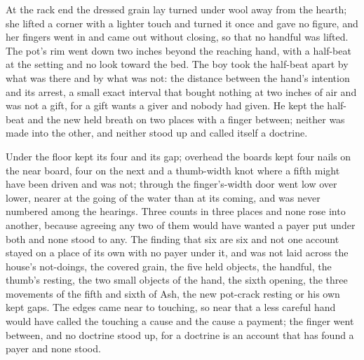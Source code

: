 At the rack end the dressed grain lay turned under wool away from the hearth; she lifted a corner with a lighter touch and turned it once and gave no figure, and her fingers went in and came out without closing, so that no handful was lifted. The pot's rim went down two inches beyond the reaching hand, with a half-beat at the setting and no look toward the bed. The boy took the half-beat apart by what was there and by what was not: the distance between the hand's intention and its arrest, a small exact interval that bought nothing at two inches of air and was not a gift, for a gift wants a giver and nobody had given. He kept the half-beat and the new held breath on two places with a finger between; neither was made into the other, and neither stood up and called itself a doctrine.

Under the floor  kept its four and its gap; overhead the boards kept four nails on the near board, four on the next and a thumb-width knot where a fifth might have been driven and was not; through the finger's-width door  went low over lower, nearer at the going of the water than at its coming, and was never numbered among the hearings. Three counts in three places and none rose into another, because agreeing any two of them would have wanted a payer put under both and none stood to any. The finding that six are six and not one account stayed on a place of its own with no payer under it, and was not laid across the house's not-doings, the covered grain, the five held objects, the handful, the thumb's resting, the two small objects of the hand, the sixth opening, the three movements of the fifth and sixth of Ash, the new pot-crack resting or his own kept gaps. The edges came near to touching, so near that a less careful hand would have called the touching a cause and the cause a payment; the finger went between, and no doctrine stood up, for a doctrine is an account that has found a payer and none stood.

\scenebreak

